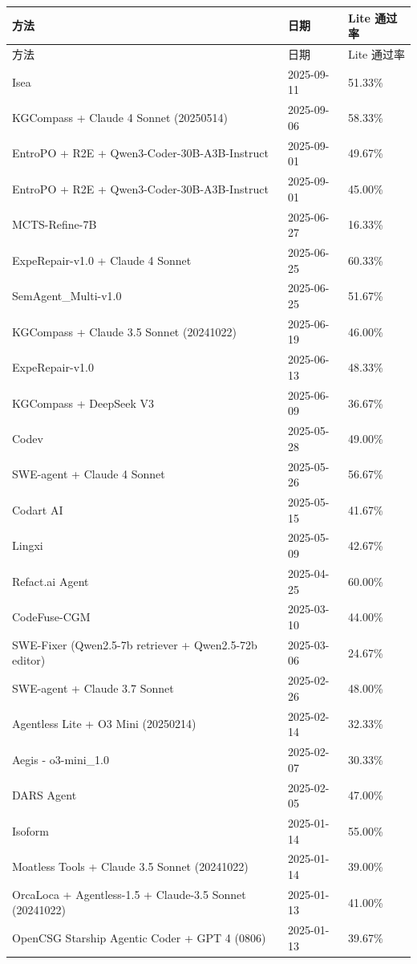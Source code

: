 \documentclass[UTF8,a4paper,11pt]{ctexart}
\begin{document}
\begin{center}
{\scriptsize
\setlength{\tabcolsep}{3pt}
\begin{longtable}{L{10.1cm} C{1.7cm} C{1.8cm}}
\toprule
方法 & 日期 & Lite 通过率 \\
\midrule
\endfirsthead
\toprule
方法 & 日期 & Lite 通过率 \\
\midrule
\endhead
Isea & 2025-09-11 & 51.33\% \\
KGCompass + Claude 4 Sonnet (20250514) & 2025-09-06 & 58.33\% \\
EntroPO + R2E + Qwen3-Coder-30B-A3B-Instruct & 2025-09-01 & 49.67\% \\
EntroPO + R2E + Qwen3-Coder-30B-A3B-Instruct & 2025-09-01 & 45.00\% \\
MCTS-Refine-7B & 2025-06-27 & 16.33\% \\
ExpeRepair-v1.0 + Claude 4 Sonnet & 2025-06-25 & 60.33\% \\
SemAgent\_Multi-v1.0 & 2025-06-25 & 51.67\% \\
KGCompass + Claude 3.5 Sonnet (20241022) & 2025-06-19 & 46.00\% \\
ExpeRepair-v1.0 & 2025-06-13 & 48.33\% \\
KGCompass + DeepSeek V3 & 2025-06-09 & 36.67\% \\
Codev & 2025-05-28 & 49.00\% \\
SWE-agent + Claude 4 Sonnet & 2025-05-26 & 56.67\% \\
Codart AI & 2025-05-15 & 41.67\% \\
Lingxi & 2025-05-09 & 42.67\% \\
Refact.ai Agent & 2025-04-25 & 60.00\% \\
CodeFuse-CGM & 2025-03-10 & 44.00\% \\
SWE-Fixer (Qwen2.5-7b retriever + Qwen2.5-72b editor) & 2025-03-06 & 24.67\% \\
SWE-agent + Claude 3.7 Sonnet & 2025-02-26 & 48.00\% \\
Agentless Lite + O3 Mini (20250214) & 2025-02-14 & 32.33\% \\
Aegis - o3-mini\_1.0 & 2025-02-07 & 30.33\% \\
DARS Agent & 2025-02-05 & 47.00\% \\
Isoform & 2025-01-14 & 55.00\% \\
Moatless Tools + Claude 3.5 Sonnet (20241022) & 2025-01-14 & 39.00\% \\
OrcaLoca + Agentless-1.5 + Claude-3.5 Sonnet (20241022) & 2025-01-13 & 41.00\% \\
OpenCSG Starship Agentic Coder + GPT 4 (0806) & 2025-01-13 & 39.67\% \\

\end{longtable}}
\end{center}
\end{document}
